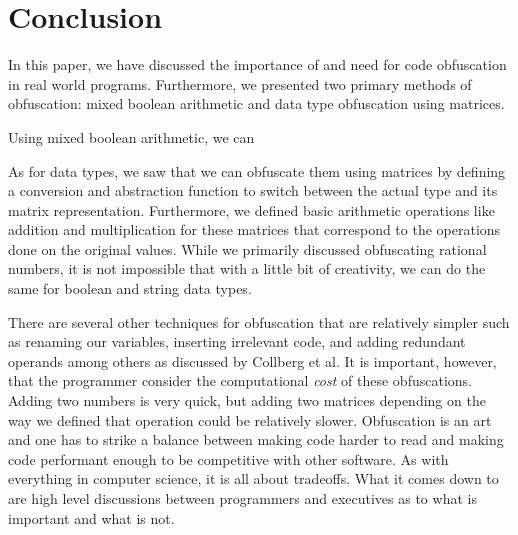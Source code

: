 \section{Conclusion}
In this paper, we have discussed the importance of and need for code
obfuscation in real world programs. Furthermore, we presented two primary
methods of obfuscation: mixed boolean arithmetic and data type obfuscation
using matrices.

Using mixed boolean arithmetic, we can

As for data types, we saw that we can obfuscate them using matrices by defining
a conversion and abstraction function to switch between the actual type and its
matrix representation. Furthermore, we defined basic arithmetic operations like
addition and multiplication for these matrices that correspond to the
operations done on the original values. While we primarily discussed
obfuscating rational numbers, it is not impossible that with a little bit of
creativity, we can do the same for boolean and string data types.

There are several other techniques for obfuscation that are relatively simpler
such as renaming our variables, inserting irrelevant code, and adding redundant
operands among others as discussed by Collberg et al. It is important, however,
that the programmer consider the computational \textit{cost} of these
obfuscations. Adding two numbers is very quick, but adding two matrices
depending on the way we defined that operation could be relatively slower.
Obfuscation is an art and one has to strike a balance between making code
harder to read and making code performant enough to be competitive with other
software. As with everything in computer science, it is all about tradeoffs.
What it comes down to are high level discussions between programmers and
executives as to what is important and what is not.
